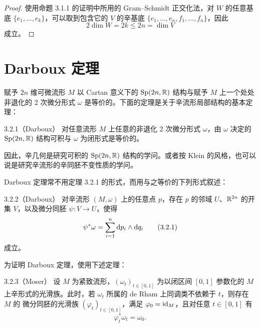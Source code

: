\begin{proof}
  使用命题 3.1.1 的证明中所用的 Gram--Schmidt 正交化法，对 $W$ 的任意基底 $\{e_1,\dots,e_k\}$，可以取到包含它的 $V$ 的辛基底 $\{e_1,\dots,e_n,f_1,\dots,f_n\}$，因此
  \begin{equation}
    2\dim W=2k\le 2n=\dim V
    \tag{3.1.8}
  \end{equation}
  成立。
\end{proof}

\section{Darboux 定理}

赋予 $2n$ 维可微流形 $M$ 以 Cartan 意义下的 $\operatorname{Sp}(2n,\mathbb{R})$ 结构与赋予 $M$ 上一个处处非退化的 2 次微分形式 $\omega$ 是等价的。下面的定理是关于辛流形局部结构的基本定理：

\begin{theorem}{3.2.1（Darboux）}
  对任意流形 $M$ 上任意的非退化 2 次微分形式 $\omega$，由 $\omega$ 决定的 $\operatorname{Sp}(2n,\mathbb{R})$ 结构可积与 $\omega$ 为闭形式是等价的。
\end{theorem}

因此，辛几何是研究可积的 $\operatorname{Sp}(2n,\mathbb{R})$ 结构的学问。或者按 Klein 的风格，也可以说是研究辛流形的辛同胚不变性质的学问。

Darboux 定理常不用定理 3.2.1 的形式，而用与之等价的下列形式叙述：

\begin{theorem*}{3.2.2（Darboux）}
  对辛流形 $(M,\omega)$ 上的任意点 $p$，存在 $p$ 的邻域 $U$、$\mathbb{R}^{2n}$ 的开集 $V$，以及微分同胚 $\psi\colon V\to U$，使得
  \begin{equation}
    \psi^*\omega=\sum_{i=1}^{n}\mathrm{d} p_i\wedge \mathrm{d} q_i
    \tag{3.2.1}
  \end{equation}
  成立。
\end{theorem*}

为证明 Darboux 定理，使用下述定理：

\begin{theorem*}{3.2.3（Moser）}
  设 $M$ 为紧致流形，$(\omega_t)_{t\in[0,1]}$ 为以闭区间 $[0,1]$ 参数化的 $M$ 上辛形式的光滑族。此时，若 $\omega_t$ 所属的 de Rham 上同调类不依赖于 $t$，则存在 $M$ 的
  微分同胚的光滑族 $(\varphi_t)_{t\in[0,1]}$，满足 $\varphi_0=\mathrm{id}_M$，且对任意 $t\in[0,1]$ 有
  \begin{equation}
    \varphi_t^*\omega_t=\omega_0.
    \tag{3.2.2}
  \end{equation}
\end{theorem*}

